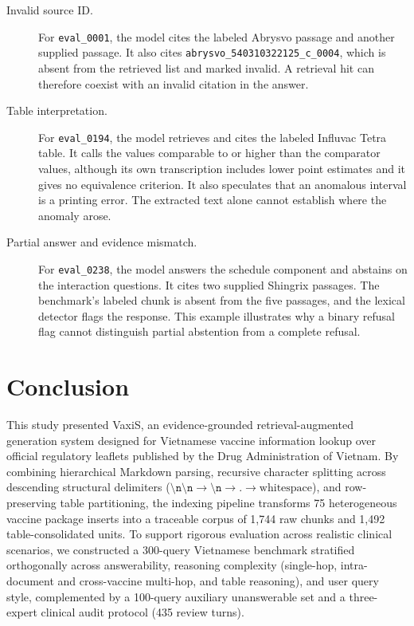 \documentclass[sn-mathphys, oneside]{sn-jnl}
\newcommand{\artifact}[1]{\nolinkurl{#1}}
\begin{document}
\begin{description}
\item[Invalid source ID.] For \artifact{eval_0001}, the model cites the labeled Abrysvo passage and another supplied passage. It also cites \artifact{abrysvo_540310322125_c_0004}, which is absent from the retrieved list and marked invalid. A retrieval hit can therefore coexist with an invalid citation in the answer.
\item[Table interpretation.] For \artifact{eval_0194}, the model retrieves and cites the labeled Influvac Tetra table. It calls the values comparable to or higher than the comparator values, although its own transcription includes lower point estimates and it gives no equivalence criterion. It also speculates that an anomalous interval is a printing error. The extracted text alone cannot establish where the anomaly arose.
\item[Partial answer and evidence mismatch.] For \artifact{eval_0238}, the model answers the schedule component and abstains on the interaction questions. It cites two supplied Shingrix passages. The benchmark's labeled chunk is absent from the five passages, and the lexical detector flags the response. This example illustrates why a binary refusal flag cannot distinguish partial abstention from a complete refusal.
\end{description}

\section{Conclusion}
\label{sec:conclusion}
This study presented VaxiS, an evidence-grounded retrieval-augmented generation system designed for Vietnamese vaccine information lookup over official regulatory leaflets published by the Drug Administration of Vietnam. By combining hierarchical Markdown parsing, recursive character splitting across descending structural delimiters ($\texttt{\textbackslash n\textbackslash n} \rightarrow \texttt{\textbackslash n} \rightarrow \texttt{.} \rightarrow \text{whitespace}$), and row-preserving table partitioning, the indexing pipeline transforms 75 heterogeneous vaccine package inserts into a traceable corpus of 1,744 raw chunks and 1,492 table-consolidated units. To support rigorous evaluation across realistic clinical scenarios, we constructed a 300-query Vietnamese benchmark stratified orthogonally across answerability, reasoning complexity (single-hop, intra-document and cross-vaccine multi-hop, and table reasoning), and user query style, complemented by a 100-query auxiliary unanswerable set and a three-expert clinical audit protocol (435 review turns).
\end{document}
